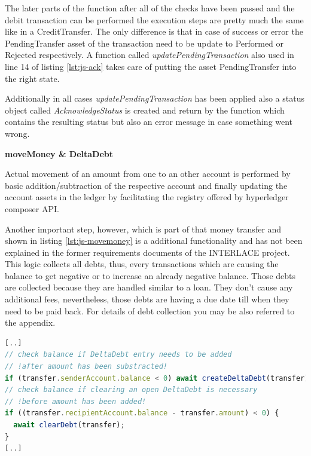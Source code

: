 The later parts of the function after all of the checks have been passed and the debit transaction can be performed the execution steps are pretty much the same like in a CreditTransfer. The only difference is that in case of success or error the PendingTransfer asset of the transaction need to be update to Performed or Rejected respectively. A function called \textit{updatePendingTransaction} also used in line 14 of listing \ref{lst:js-ack} takes care of putting the asset PendingTransfer into the right state.

Additionally in all cases \textit{updatePendingTransaction} has been applied also a status object called \textit{AcknowledgeStatus} is created and return by the function which contains the resulting status but also an error message in case something went wrong.

\textbf{moveMoney \& DeltaDebt}

Actual movement of an amount from one to an other account is performed by basic addition/subtraction of the respective account and finally updating the account assets in the ledger by facilitating the registry offered by hyperledger composer API.

Another important step, however, which is part of that money transfer and shown in listing \ref{lst:js-movemoney} is a additional functionality and has not been explained in the former requirements documents of the INTERLACE project. This logic collects all debts, thus, every transactions which are causing the balance to get negative or to increase an already negative balance. Those debts are collected because they are handled similar to a loan. They don't cause any additional fees, nevertheless, those debts are having a due date till when they need to be paid back. For details of debt collection you may be also referred to the appendix.

\begin{center}
\begin{minipage}{0.8\textwidth}
\small
\begin{lstlisting}[language=javascript,firstnumber=1,caption={\bf\small moveMoney JavaScript excerpt}, captionpos=b,label=lst:js-movemoney]
[..]
// check balance if DeltaDebt entry needs to be added
// !after amount has been substracted!
if (transfer.senderAccount.balance < 0) await createDeltaDebt(transfer);
// check balance if clearing an open DeltaDebt is necessary
// !before amount has been added!
if ((transfer.recipientAccount.balance - transfer.amount) < 0) {
  await clearDebt(transfer);
}
[..]
\end{lstlisting}
\end{minipage}
\end{center}

